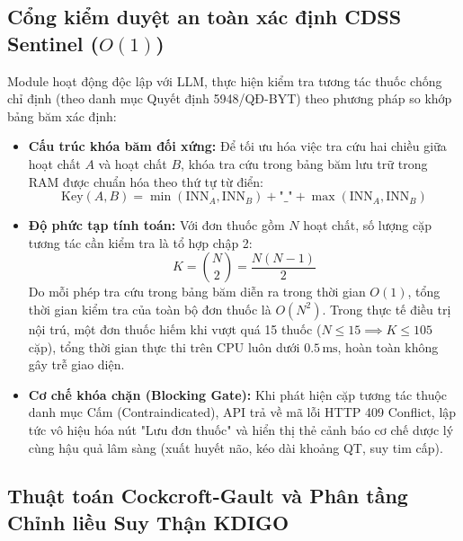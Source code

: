 \subsection{Cổng kiểm duyệt an toàn xác định CDSS Sentinel \texorpdfstring{($O(1)$)}{(O(1))}}
\label{subsec:cdss_sentinel}

Module  hoạt động độc lập với LLM, thực hiện kiểm tra tương tác thuốc chống chỉ định (theo danh mục Quyết định 5948/QĐ-BYT) theo phương pháp so khớp bảng băm xác định:

\begin{itemize}[leftmargin=1.5em]
    \item \textbf{Cấu trúc khóa băm đối xứng:} Để tối ưu hóa việc tra cứu hai chiều giữa hoạt chất $A$ và hoạt chất $B$, khóa tra cứu trong bảng băm lưu trữ trong RAM được chuẩn hóa theo thứ tự từ điển:
    \begin{equation}
        \text{Key}(A, B) = \min(\text{INN}_A, \text{INN}_B) + \text{"\_"} + \max(\text{INN}_A, \text{INN}_B)
    \end{equation}
    \item \textbf{Độ phức tạp tính toán:} Với đơn thuốc gồm $N$ hoạt chất, số lượng cặp tương tác cần kiểm tra là tổ hợp chập 2:
    \begin{equation}
        K = \binom{N}{2} = \frac{N(N-1)}{2}
    \end{equation}
    Do mỗi phép tra cứu trong bảng băm diễn ra trong thời gian $O(1)$, tổng thời gian kiểm tra của toàn bộ đơn thuốc là $O(N^2)$. Trong thực tế điều trị nội trú, một đơn thuốc hiếm khi vượt quá 15 thuốc ($N \le 15 \implies K \le 105$ cặp), tổng thời gian thực thi trên CPU luôn dưới $0.5\,\text{ms}$, hoàn toàn không gây trễ giao diện.
    \item \textbf{Cơ chế khóa chặn (Blocking Gate):} Khi phát hiện cặp tương tác thuộc danh mục Cấm (Contraindicated), API trả về mã lỗi HTTP 409 Conflict, lập tức vô hiệu hóa nút "Lưu đơn thuốc" và hiển thị thẻ cảnh báo cơ chế dược lý cùng hậu quả lâm sàng (xuất huyết não, kéo dài khoảng QT, suy tim cấp).
\end{itemize}

\subsection{Thuật toán Cockcroft-Gault và Phân tầng Chỉnh liều Suy Thận KDIGO}
\label{subsec:cockcroft_gault}

